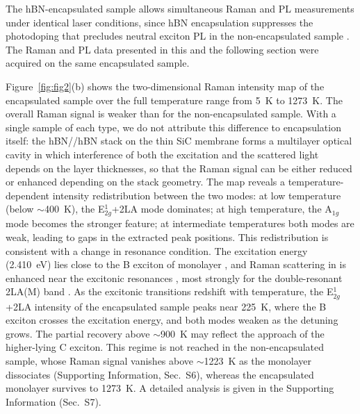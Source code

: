 \documentclass[letterpaper]{article}
\DeclareRobustCommand{\rev}[1]{#1}
\begin{document}
The hBN-encapsulated sample allows simultaneous Raman and PL measurements under
identical laser conditions, since hBN encapsulation suppresses the photodoping
that precludes \rev{neutral exciton} PL in the non-encapsulated sample \cite{cadiz-2016}.
The Raman and PL data presented in this and the following section were acquired
on the same encapsulated sample.

Figure~\ref{fig:fig2}(b) shows the two-dimensional Raman intensity map of the
encapsulated sample over the full temperature range from 5~K to
1273~K. \rev{The overall Raman signal is weaker than for the non-encapsulated
sample. With a single sample of each type, we do not attribute this difference
to encapsulation itself: the hBN/}\rev{/hBN stack on the thin SiC membrane
forms a multilayer optical cavity in which interference of both the excitation
and the scattered light depends on the layer thicknesses, so that the Raman
signal can be either reduced or enhanced depending on the stack geometry.} The map reveals a
temperature-dependent intensity redistribution between the two modes: at low
temperature (below \rev{$\sim$400~K}), the E$^1_{2g}$+2LA mode dominates; at high
temperature, the A$_{1g}$ mode becomes the stronger feature; at intermediate
temperatures both modes are weak, leading to gaps in the extracted peak
positions. \rev{This redistribution is consistent with a change in resonance
condition. The excitation energy (2.410~eV) lies close to the B exciton of
monolayer} \rev{, and Raman scattering in}  \rev{is enhanced near
the excitonic resonances} \cite{delcorro-2016}\rev{, most strongly for the
double-resonant 2LA(M) band} \cite{berkdemir-2013}. \rev{As the excitonic
transitions redshift with temperature, the E$^1_{2g}$+2LA intensity of the
encapsulated sample peaks near 225~K, where the B exciton crosses the
excitation energy, and both modes weaken as the detuning grows. The partial
recovery above $\sim$900~K may reflect the approach of the higher-lying C
exciton. This regime is not reached in the non-encapsulated sample, whose
Raman signal vanishes above $\sim$1223~K as the monolayer dissociates
(Supporting Information, Sec.~S6), whereas the encapsulated monolayer
survives to 1273~K. A detailed analysis is given in the Supporting
Information (Sec.~S7).}
\end{document}
